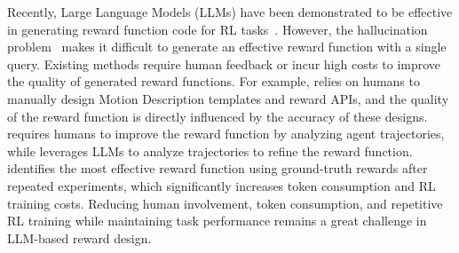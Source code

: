 \documentclass{article}
\theoremstyle{plain}
\theoremstyle{definition}
\theoremstyle{remark}
\begin{document}
Recently, Large Language Models (LLMs) have been demonstrated to be effective in generating reward function code for RL tasks~\cite{L2R,Text2Reward,Eureka,li2024auto}. However, the hallucination problem~\cite{rawte2023survey,huang2023survey,liu2024exploring} makes it difficult to generate an effective reward function with a single query. Existing methods require human feedback or incur high costs to improve the quality of generated reward functions. For example, \cite{L2R} relies on humans to manually design Motion Description templates and reward APIs, and the quality of the reward function is directly influenced by the accuracy of these designs. \cite{Text2Reward} requires humans to improve the reward function by analyzing agent trajectories, while \cite{li2024auto} leverages LLMs to analyze trajectories to refine the reward function. \cite{Eureka} identifies the most effective reward function using ground-truth rewards after repeated experiments, which significantly increases token consumption and RL training costs. Reducing human involvement, token consumption, and repetitive RL training while maintaining task performance remains a great challenge in LLM-based reward design.
\end{document}
